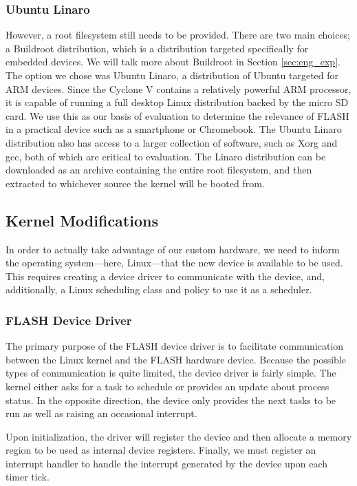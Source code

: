 \documentclass{sig-alternate-10pt}
\begin{document}
\subsubsection{Ubuntu Linaro}
\label{subsubsec:linaro}
However, a root filesystem still needs to be provided. There are two main choices; a Buildroot distribution, which is a distribution targeted specifically for embedded devices. We will talk more about Buildroot in Section \ref{sec:eng_exp}. The option we chose was Ubuntu Linaro, a distribution of Ubuntu targeted for ARM devices. Since the Cyclone V contains a relatively powerful ARM processor, it is capable of running a full desktop Linux distribution backed by the micro SD card. We use this as our basis of evaluation to determine the relevance of FLASH in a practical device such as a smartphone or Chromebook. The Ubuntu Linaro distribution also has access to a larger collection of software, such as Xorg and gcc, both of which are critical to evaluation. The Linaro distribution can be downloaded as an archive containing the entire root filesystem, and then extracted to whichever source the kernel will be booted from.

\subsection{Kernel Modifications}
In order to actually take advantage of our custom hardware, we need to
inform the operating system---here, Linux---that the new device is available
to be used.  This requires creating a device driver to communicate with the
device, and, additionally, a Linux scheduling class and policy to use it as
a scheduler.

\subsubsection{FLASH Device Driver}
The primary purpose of the FLASH device driver is to facilitate
communication between the Linux kernel and the FLASH hardware device.
Because the possible types of communication is quite limited, the device
driver is fairly simple.  The kernel either asks for a task to schedule or
provides an update about process status.  In the opposite direction, the
device only provides the next tasks to be run as well as raising an
occasional interrupt.

Upon initialization, the driver will register the device and then allocate
a memory region to be used as internal device registers.  Finally, we must
register an interrupt handler to handle the interrupt generated by the
device upon each timer tick.
\end{document}
